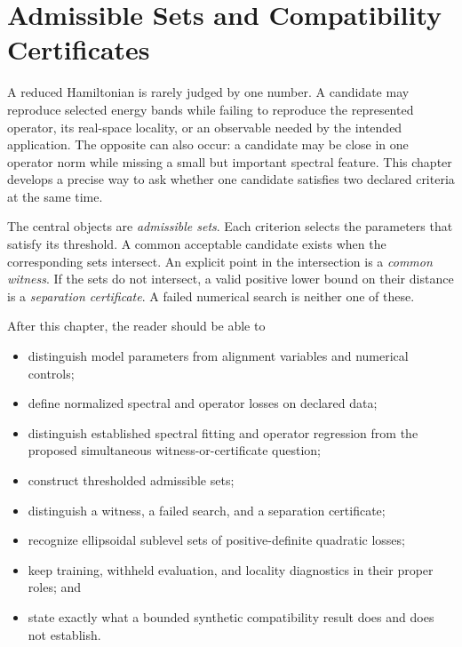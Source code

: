 \chapter{Admissible Sets and Compatibility Certificates}

\label{ch:admissible-sets-certificates}


A reduced Hamiltonian is rarely judged by one number. A candidate may reproduce
selected energy bands while failing to reproduce the represented operator, its
real-space locality, or an observable needed by the intended application. The
opposite can also occur: a candidate may be close in one operator norm while
missing a small but important spectral feature. This chapter develops a precise
way to ask whether one candidate satisfies two declared criteria at the same
time.

The central objects are \emph{admissible sets}. Each criterion selects the
parameters that satisfy its threshold. A common acceptable candidate exists
when the corresponding sets intersect. An explicit point in the intersection
is a \emph{common witness}. If the sets do not intersect, a valid positive
lower bound on their distance is a \emph{separation certificate}. A failed
numerical search is neither one of these.

After this chapter, the reader should be able to
\begin{itemize}
  \item distinguish model parameters from alignment variables and numerical
        controls;
  \item define normalized spectral and operator losses on declared data;
  \item distinguish established spectral fitting and operator regression from
        the proposed simultaneous witness-or-certificate question;
  \item construct thresholded admissible sets;
  \item distinguish a witness, a failed search, and a separation certificate;
  \item recognize ellipsoidal sublevel sets of positive-definite quadratic
        losses;
  \item keep training, withheld evaluation, and locality diagnostics in their
        proper roles; and
  \item state exactly what a bounded synthetic compatibility result does and
        does not establish.
\end{itemize}

